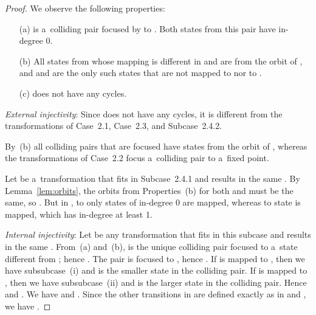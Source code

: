 \documentclass{amsart}
\begin{document}
\begin{proof}
We observe the following properties:
\begin{enumerate}
\item[(a)]  is a~colliding pair focused by  to .
Both states from this pair have in-degree 0.

\item[(b)] All states from  whose mapping is different in  and  are from the orbit of ,
and  and  are the only such states that are not mapped to  nor to .

\item[(c)]  does not have any cycles.
\end{enumerate}

\textit{External injectivity}:
Since  does not have any cycles, it is different from the transformations of Case~2.1, Case~2.3, and Subcase~2.4.2.

By~(b) all colliding pairs that are focused have states from the orbit of , whereas the transformations of Case~2.2 focus a~colliding pair to a~fixed point.

Let  be a~transformation that fits in Subcase~2.4.1 and results in the same .
By Lemma~\ref{lem:orbits}, the orbits from Properties~(b) for both  and  must be the same, so .
But in , to  only states of in-degree 0 are mapped, whereas to  state  is mapped, which has in-degree at least 1.

\textit{Internal injectivity}:
Let  be any transformation that fits in this subcase and results in the same .
From~(a) and~(b),  is the unique colliding pair focused to a~state different from ; hence .
The pair is focused to , hence .
If  is mapped to , then we have subsubcase~(i) and  is the smaller state in the colliding pair.
If  is mapped to , then we have subsubcase~(ii) and  is the larger state in the colliding pair.
Hence  and . We have  and .
Since the other transitions in  are defined exactly as in  and , we have .


\end{proof}
\end{document}
